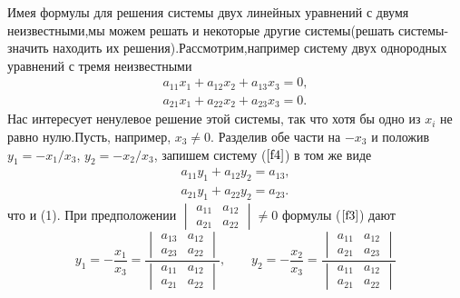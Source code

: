 {Имея формулы для решения системы двух линейных уравнений с двумя неизвестными,мы можем решать и некоторые другие системы(решать системы-значить находить их решения).Рассмотрим,например систему двух однородных уравнений с тремя неизвестными 
\begin{equation}
\label{f4}
\begin{matrix}
a_{11}x_{1}+a_{12}x_{2}+a_{13}x_{3}=0, \\
a_{21}x_{1}+a_{22}x_{2}+a_{23}x_{3}=0.
\end{matrix}
\end{equation}
Нас интересует ненулевое решение этой системы, так что хотя бы одно из $x_{i}$ не равно нулю.Пусть, например, $x_{3}\ne0.$ Разделив обе части на $-x_{3}$ и положив
$y_{1}=-x_{1}/x_{3}$, $y_{2}=-x_{2}/x_{3}$, запишем систему ($\ref{f4}$) в том же виде 
$$
\begin{matrix}
a_{11}y_{1}+a_{12}y_{2}=a_{13}, \\
a_{21}y_{1}+a_{22}y_{2}=a_{23}.
\end{matrix}
$$
что и (1). При предположении $\begin{vmatrix}a_{11}&a_{12}\\a_{21}&a_{22}\end{vmatrix}\ne0$ формулы ($\ref{f3}$) дают 
$$
y_{1}=-\frac{x_1}{x_3}=\frac{\begin{vmatrix}a_{13}&a_{12}\\a_{23}&a_{22}\end{vmatrix}}{\begin{vmatrix}a_{11}&a_{12}\\a_{21}&a_{22}\end{vmatrix}},\qquad
y_{2}=-\frac{x_2}{x_3}=\frac{\begin{vmatrix}a_{11}&a_{12}\\a_{21}&a_{23}\end{vmatrix}}{\begin{vmatrix}a_{11}&a_{12}\\a_{21}&a_{22}\end{vmatrix}}
$$


}
